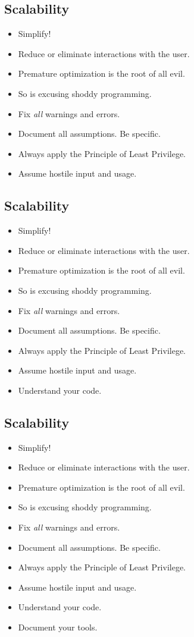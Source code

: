 \documentclass[xga]{xdvislides}
\begin{document}
\subsection{Scalability}
\begin{itemize}
	\item Simplify!
	\item Reduce or eliminate interactions with the user.
	\item Premature optimization is the root of all evil.
	\item So is excusing shoddy programming.
	\item Fix {\em all} warnings and errors.
	\item Document all assumptions.  Be specific.
	\item Always apply the Principle of Least Privilege.
	\item Assume hostile input and usage.
\end{itemize}

\subsection{Scalability}
\begin{itemize}
	\item Simplify!
	\item Reduce or eliminate interactions with the user.
	\item Premature optimization is the root of all evil.
	\item So is excusing shoddy programming.
	\item Fix {\em all} warnings and errors.
	\item Document all assumptions.  Be specific.
	\item Always apply the Principle of Least Privilege.
	\item Assume hostile input and usage.
	\item Understand your code.
\end{itemize}

\subsection{Scalability}
\begin{itemize}
	\item Simplify!
	\item Reduce or eliminate interactions with the user.
	\item Premature optimization is the root of all evil.
	\item So is excusing shoddy programming.
	\item Fix {\em all} warnings and errors.
	\item Document all assumptions.  Be specific.
	\item Always apply the Principle of Least Privilege.
	\item Assume hostile input and usage.
	\item Understand your code.
	\item Document your tools.
\end{itemize}
\end{document}
